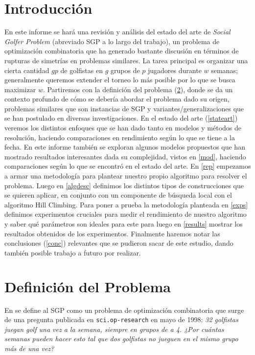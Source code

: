 \documentclass[letter, 10pt]{article}
\begin{document}
\section{Introducci\'on}

En este informe se hará una revisión y análisis del estado del arte de \textit{Social Golfer Problem} (abreviado SGP a lo largo del trabajo), un problema de optimización combinatoria que ha generado bastante discusión en términos de rupturas de simetrías en problemas similares. La tarea principal es organizar una cierta cantidad $gp$ de golfistas en $g$ grupos de $p$ jugadores durante $w$ semanas; generalmente queremos extender el torneo lo más posible por lo que se busca maximizar $w$. Partiremos con la definición del problema (\ref{def}), donde se da un contexto profundo de cómo se debería abordar el problema dado su origen, problemas similares que son instancias de SGP y variantes/generalizaciones que se han postulado en diversas investigaciones. En el estado del arte (\ref{stateart}) veremos los distintos enfoques que se han dado tanto en modelos y métodos de resolución, haciendo comparaciones en rendimiento según lo que se tiene a la fecha. En este informe también se exploran algunos modelos propuestos que han mostrado resultados interesantes dada su complejidad, vistos en \ref{mod}, haciendo comparaciones según lo que se encontró en el estado del arte. En \ref{rep} empezamos a armar una metodología para plantear nuestro propio algoritmo para resolver el problema. Luego en \ref{algdesc} definimos los distintos tipos de construcciones que se quieren aplicar, en conjunto con un componente de búsqueda local con el algoritmo Hill Climbing. Para poner a prueba la metodología planteada en \ref{exps} definimos experimentos cruciales para medir el rendimiento de nuestro algoritmo y saber qué parámetros son ideales para este para luego en \ref{results} mostrar los resultados obtenidos de los experimentos. Finalmente haremos notar las conclusiones (\ref{conc}) relevantes que se pudieron sacar de este estudio, dando también posible trabajo a futuro por realizar.

\section{Definici\'on del Problema} \label{def}

En \cite{SolTriska1} se define al SGP como un problema de optimización combinatoria que surge de una pregunta publicada en \texttt{sci.op-research} en mayo de 1998: \textit{32 golfistas juegan golf una vez a la semana, siempre en grupos de a 4. ¿Por cuántas semanas pueden hacer esto tal que dos golfistas no jueguen en el mismo grupo más de una vez?}
\end{document}
